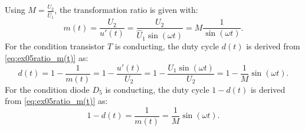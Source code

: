 \begin{solutionblock}
    Using $M = \frac{U_{\mathrm{2}}}{\hat U_{\mathrm{1}}}$, the transformation ratio is given with:
    \begin{equation}
        m(t) = \frac{U_{\mathrm{2}}}{u'(t)}=\frac{U_{\mathrm{2}}}{\hat U_{\mathrm{1}} \sin(\omega t)} = M \frac{1}{\sin(\omega t)}.
    \end{equation}
    For the condition transistor $T$ is conducting, the duty cycle $d(t)$ is derived from \eqref{eq:ex05ratio_m(t)} as:
\begin{equation}
    d(t) = 1-\frac{1}{m(t)} = 1- \frac{u'(t)}{U_{\mathrm{2}}}=1- \frac{U_{\mathrm{1}}\sin(\omega t)}{U_{\mathrm{2}}} = 1 -\frac{1}{M} \sin(\omega t).
\end{equation}
For the condition diode $D_{\mathrm{5}}$ is conducting, the duty cycle $1-d(t)$ is derived from \eqref{eq:ex05ratio_m(t)} as:
\begin{equation}
    1-d(t) = \frac{1}{m(t)}=\frac{1}{M} \sin(\omega t).
\end{equation}
\end{solutionblock}

